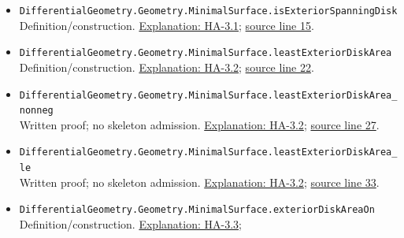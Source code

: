 \documentclass[
  letterpaper,
  11pt]{article}
\begin{document}
\begin{itemize}
\item
  {\small\texttt{Differential\allowbreak{}Geometry.\allowbreak{}Geometry.\allowbreak{}Minimal\allowbreak{}Surface.\allowbreak{}is\allowbreak{}Exterior\allowbreak{}Spanning\allowbreak{}Disk}}\\
  Definition/construction. \hyperref[ha-3-1]{Explanation: HA-3.1};
  \href{https://github.com/qinz1yang/differential-geometry-dev/blob/ea0fae60ee01ef8c8d9b57a51794c6538f679c5d/DifferentialGeometry/Geometry/MinimalSurface/ExteriorDiskArea.lean\#L15}{source
  line 15}.
\item
  {\small\texttt{Differential\allowbreak{}Geometry.\allowbreak{}Geometry.\allowbreak{}Minimal\allowbreak{}Surface.\allowbreak{}least\allowbreak{}Exterior\allowbreak{}Disk\allowbreak{}Area}}\\
  Definition/construction. \hyperref[ha-3-2]{Explanation: HA-3.2};
  \href{https://github.com/qinz1yang/differential-geometry-dev/blob/ea0fae60ee01ef8c8d9b57a51794c6538f679c5d/DifferentialGeometry/Geometry/MinimalSurface/ExteriorDiskArea.lean\#L22}{source
  line 22}.
\item
  {\small\texttt{Differential\allowbreak{}Geometry.\allowbreak{}Geometry.\allowbreak{}Minimal\allowbreak{}Surface.\allowbreak{}least\allowbreak{}Exterior\allowbreak{}Disk\allowbreak{}Area\_\allowbreak{}nonneg}}\\
  Written proof; no skeleton admission. \hyperref[ha-3-2]{Explanation:
  HA-3.2};
  \href{https://github.com/qinz1yang/differential-geometry-dev/blob/ea0fae60ee01ef8c8d9b57a51794c6538f679c5d/DifferentialGeometry/Geometry/MinimalSurface/ExteriorDiskArea.lean\#L27}{source
  line 27}.
\item
  {\small\texttt{Differential\allowbreak{}Geometry.\allowbreak{}Geometry.\allowbreak{}Minimal\allowbreak{}Surface.\allowbreak{}least\allowbreak{}Exterior\allowbreak{}Disk\allowbreak{}Area\_\allowbreak{}le}}\\
  Written proof; no skeleton admission. \hyperref[ha-3-2]{Explanation:
  HA-3.2};
  \href{https://github.com/qinz1yang/differential-geometry-dev/blob/ea0fae60ee01ef8c8d9b57a51794c6538f679c5d/DifferentialGeometry/Geometry/MinimalSurface/ExteriorDiskArea.lean\#L33}{source
  line 33}.
\item
  {\small\texttt{Differential\allowbreak{}Geometry.\allowbreak{}Geometry.\allowbreak{}Minimal\allowbreak{}Surface.\allowbreak{}exterior\allowbreak{}Disk\allowbreak{}Area\allowbreak{}On}}\\
  Definition/construction. \hyperref[ha-3-3]{Explanation: HA-3.3};

\end{itemize}
\end{document}
